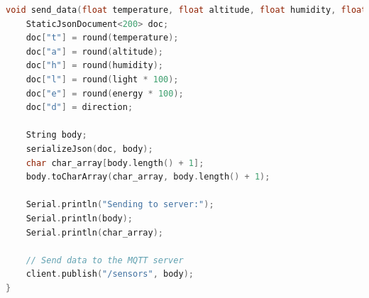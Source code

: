\begin{lstlisting}[language=C,caption={Snippet of our \texttt{send\_data} function which serializes our sensor data into JSON and sends it over the MQTT broker.}]
void send_data(float temperature, float altitude, float humidity, float light, float energy, String direction) {
    StaticJsonDocument<200> doc;
    doc["t"] = round(temperature);
    doc["a"] = round(altitude);
    doc["h"] = round(humidity);
    doc["l"] = round(light * 100);
    doc["e"] = round(energy * 100);
    doc["d"] = direction;

    String body;
    serializeJson(doc, body);
    char char_array[body.length() + 1];
    body.toCharArray(char_array, body.length() + 1);

    Serial.println("Sending to server:");
    Serial.println(body);
    Serial.println(char_array);

    // Send data to the MQTT server
    client.publish("/sensors", body);
}
\end{lstlisting}